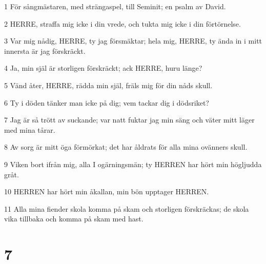 \par 1 För sångmästaren, med strängaspel, till Seminit; en psalm av David.
\par 2 HERRE, straffa mig icke i din vrede, och tukta mig icke i din förtörnelse.
\par 3 Var mig nådig, HERRE, ty jag försmäktar; hela mig, HERRE, ty ända in i mitt innersta är jag förskräckt.
\par 4 Ja, min själ är storligen förskräckt; ack HERRE, huru länge?
\par 5 Vänd åter, HERRE, rädda min själ, fräls mig för din nåds skull.
\par 6 Ty i döden tänker man icke på dig; vem tackar dig i dödsriket?
\par 7 Jag är så trött av suckande; var natt fuktar jag min säng och väter mitt läger med mina tårar.
\par 8 Av sorg är mitt öga förmörkat; det har åldrats för alla mina ovänners skull.
\par 9 Viken bort ifrån mig, alla I ogärningsmän; ty HERREN har hört min högljudda gråt.
\par 10 HERREN har hört min åkallan, min bön upptager HERREN.
\par 11 Alla mina fiender skola komma på skam och storligen förskräckas; de skola vika tillbaka och komma på skam med hast.

\chapter{7}

